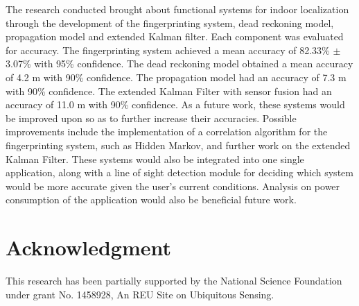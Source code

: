 \documentclass[conference]{IEEEtran}
\begin{document}
The research conducted brought about functional systems for indoor localization through the development of the fingerprinting system, dead reckoning model, propagation model and extended Kalman filter. Each component was evaluated for accuracy. The fingerprinting system achieved a mean accuracy of 82.33\% $\pm$ 3.07\% with 95\% confidence. The dead reckoning model obtained a mean accuracy of 4.2 m with 90\% confidence. The propagation model had an accuracy of 7.3 m with 90\% confidence. The extended Kalman Filter with sensor fusion had an accuracy of 11.0 m with 90\% confidence. As a future work, these systems would be improved upon so as to further increase their accuracies. Possible improvements include the implementation of a correlation algorithm for the fingerprinting system, such as Hidden Markov, and further work on the extended Kalman Filter. These systems would also be integrated into one single application, along with a line of sight detection module for deciding which system would be more accurate given the user’s current conditions. Analysis on power consumption of the application would also be beneficial future work.


\section*{Acknowledgment}
This research has been partially supported by the National Science Foundation under grant No. 1458928, An REU Site on Ubiquitous Sensing.




\end{document}
